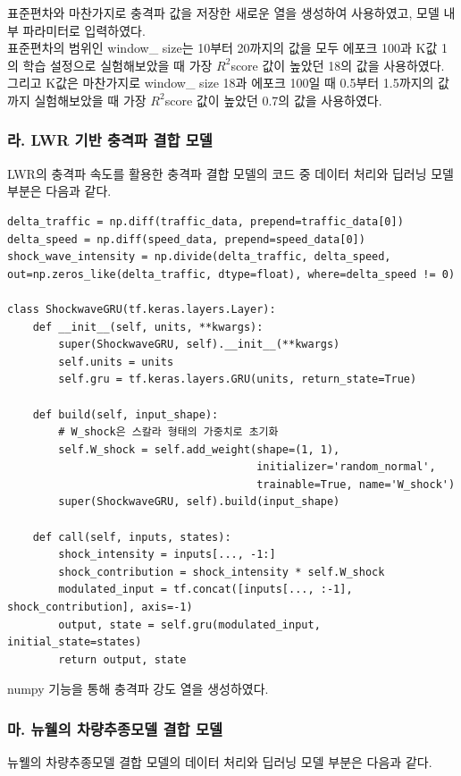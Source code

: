 \documentclass[11pt]{report}
\begin{document}
\indent 표준편차와 마찬가지로 충격파 값을 저장한 새로운 열을 생성하여 사용하였고,
모델 내부 파라미터로 입력하였다. \\
\indent 표준편차의 범위인 window\_ size는 10부터 20까지의 값을 모두 에포크 100과 K값 1의 학습 설정으로 실험해보았을 때 가장 $R^2$score 값이 높았던 18의 값을 사용하였다. 
그리고 K값은 마찬가지로 window\_ size 18과 에포크 100일 때 0.5부터 1.5까지의 값까지 실험해보았을 때 가장 $R^2$score 값이 높았던 0.7의 값을 사용하였다. 

\subsubsection*{라. LWR 기반 충격파 결합 모델}
LWR의 충격파 속도를 활용한 충격파 결합 모델의 코드 중 데이터 처리와 딥러닝 모델 부분은 다음과 같다. 

\begin{scriptsize}  %
\begin{verbatim}
delta_traffic = np.diff(traffic_data, prepend=traffic_data[0])
delta_speed = np.diff(speed_data, prepend=speed_data[0])
shock_wave_intensity = np.divide(delta_traffic, delta_speed, 
out=np.zeros_like(delta_traffic, dtype=float), where=delta_speed != 0)

class ShockwaveGRU(tf.keras.layers.Layer):
    def __init__(self, units, **kwargs):
        super(ShockwaveGRU, self).__init__(**kwargs)
        self.units = units
        self.gru = tf.keras.layers.GRU(units, return_state=True)

    def build(self, input_shape):
        # W_shock은 스칼라 형태의 가중치로 초기화
        self.W_shock = self.add_weight(shape=(1, 1),
                                       initializer='random_normal',
                                       trainable=True, name='W_shock')
        super(ShockwaveGRU, self).build(input_shape)

    def call(self, inputs, states):
        shock_intensity = inputs[..., -1:]
        shock_contribution = shock_intensity * self.W_shock
        modulated_input = tf.concat([inputs[..., :-1], shock_contribution], axis=-1)
        output, state = self.gru(modulated_input, initial_state=states)
        return output, state
\end{verbatim}
\end{scriptsize}
\indent numpy 기능을 통해 충격파 강도 열을 생성하였다. 

\subsubsection*{마. 뉴웰의 차량추종모델 결합 모델}
뉴웰의 차량추종모델 결합 모델의 데이터 처리와 딥러닝 모델 부분은 다음과 같다. 
\end{document}
